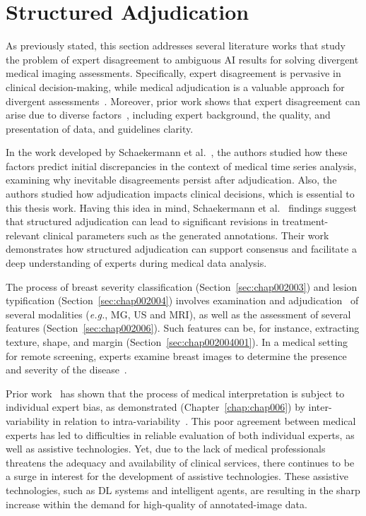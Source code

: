\section{Structured Adjudication}
\label{sec:chap003006}

As previously stated, this section addresses several literature works that study the problem of expert disagreement to ambiguous \ac{AI} results for solving divergent medical imaging assessments.
Specifically, expert disagreement is pervasive in clinical decision-making, while medical adjudication is a valuable approach for divergent assessments~\cite{10.1145/3359178}.
Moreover, prior work shows that expert disagreement can arise due to diverse factors~\cite{NIAZI2019e253}, including expert background, the quality, and presentation of data, and guidelines clarity.

In the work developed by Schaekermann et al.~\cite{10.1145/3359178}, the authors studied how these factors predict initial discrepancies in the context of medical time series analysis, examining why inevitable disagreements persist after adjudication.
Also, the authors studied how adjudication impacts clinical decisions, which is essential to this thesis work.
Having this idea in mind, Schaekermann et al.~\cite{10.1145/3359178} findings suggest that structured adjudication can lead to significant revisions in treatment-relevant clinical parameters such as the generated annotations.
Their work demonstrates how structured adjudication can support consensus and facilitate a deep understanding of experts during medical data analysis.

The process of breast severity classification (Section~\ref{sec:chap002003}) and lesion typification (Section~\ref{sec:chap002004}) involves examination and adjudication~\cite{10.1145/3359178} of several modalities ({\it e.g.}, \ac{MG}, \ac{US} and \ac{MRI}), as well as the assessment of several features (Section~\ref{sec:chap002006}).
Such features can be, for instance, extracting texture, shape, and margin (Section~\ref{sec:chap002004001}).
In a medical setting for remote screening, experts examine breast images to determine the presence and severity of the disease~\cite{10.1145/3399715.3399744}.

Prior work~\cite{MIRANDA2015334} has shown that the process of medical interpretation is subject to individual expert bias, as demonstrated (Chapter~\ref{chap:chap006}) by inter-variability in relation to intra-variability~\cite{NIAZI2019e253}.
This poor agreement between medical experts has led to difficulties in reliable evaluation of both individual experts, as well as assistive technologies.
Yet, due to the lack of medical professionals threatens the adequacy and availability of clinical services, there continues to be a surge in interest for the development of assistive technologies.
These assistive technologies, such as \ac{DL} systems and intelligent agents, are resulting in the sharp increase within the demand for high-quality of annotated-image data.

